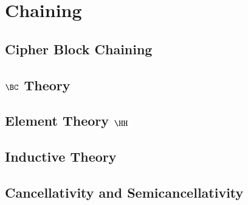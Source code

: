 \chapter{Chaining}\label{chap:chaining}

\section{Cipher Block Chaining}\label{sec:cbc}

\section{\texorpdfstring{$\BC$}{BC} Theory}\label{sec:bc-theory}

\section{Element Theory \texorpdfstring{$\HH$}{H}}\label{sec:elt-theory}

\section{Inductive Theory}\label{sec:inductive-theory}

\section{Cancellativity and Semicancellativity}\label{sec:cancel}

